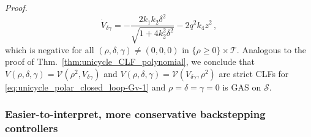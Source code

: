 \documentclass[journal,twoside,web]{ieeecolor}
\theoremstyle{definition}
\renewenvironment{proof}[1][Proof]{\par\pushQED{\qed}\normalfont\textit{#1.}~}{\popQED\par}
\begin{document}
\begin{proof}
\begin{equation}
\dot V_{\delta \gamma} = -\frac{2 k_1 k_2  \delta^2}{\sqrt{1+4k_2^2\delta^2}} -  2q^2 k_4 z^2\,, \label{eq:Backstepping_Lyapunov_function_dot}
\end{equation}
which is negative for all $(\rho,\delta,\gamma) \ne (0,0,0)$ in $\{\rho \ge 0\} \times \mathcal{T}$.
Analogous to the proof of Thm.~\ref{thm:unicycle_CLF_polynomial}, we conclude that $V(\rho, \delta, \gamma) = \mathcal{V}(\rho^2, V_{\delta \gamma})$ and $V(\rho, \delta, \gamma) = \mathcal{V}(V_{\delta \gamma},\rho^2)$ are strict CLFs for \eqref{eq:unicycle_polar_closed_loop-Gv-1} and  %
$\rho =  \delta = \gamma = 0$ is GAS on $\mathcal{S}$.
\end{proof}  

\subsubsection*{Easier-to-interpret, more conservative backstepping controllers}
\end{document}
